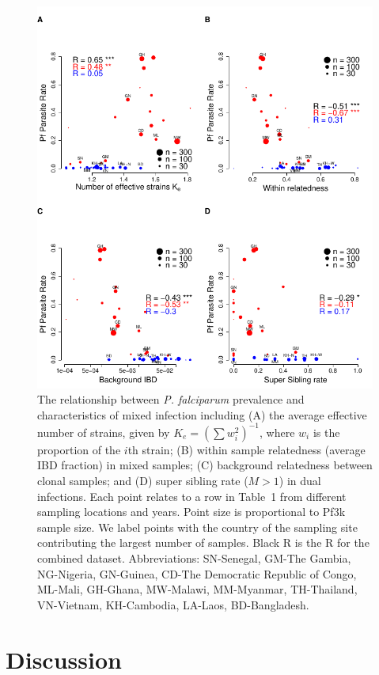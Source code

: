 \documentclass[9pt,lineno]{elife}
\begin{document}
\begin{figure}[htp]
  \centering{}
  \includegraphics[width=\textwidth]{Fig5.pdf}
  \caption{The relationship between {\it P. falciparum} prevalence and characteristics of mixed infection including (A) the average effective number of strains, given by $K_e = (\sum w_i^2)^{-1}$, where $w_i$ is the proportion of the $i$th strain; (B) within sample relatedness (average IBD fraction) in mixed samples; (C) background relatedness between clonal samples; and (D) super sibling rate ($M>1$) in dual infections. Each point relates to a row in Table~1 from different sampling locations and years. Point size is proportional to Pf3k sample size. We label points with the country of the sampling site contributing the largest number of samples. Black R is the R for the combined dataset. Abbreviations: SN-Senegal, GM-The Gambia, NG-Nigeria, GN-Guinea, CD-The Democratic Republic of Congo, ML-Mali, GH-Ghana, MW-Malawi, MM-Myanmar, TH-Thailand, VN-Vietnam, KH-Cambodia, LA-Laos, BD-Bangladesh.}
  \label{fig:model}
\end{figure}



\section{Discussion}
\end{document}
